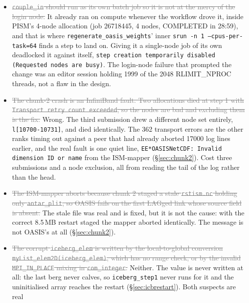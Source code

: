\documentclass[11pt,a4paper]{article}
\newcommand{\code}[1]{\texttt{\small #1}}
\newcommand{\dead}[1]{\textcolor{gray}{\sout{#1}}}
\begin{document}
\begin{itemize}
{      ISM-mapper starts.} Held for one leg and then failed. It recurred on 2026-08-10 with the
      mapper alive and nothing else dead, and did not recur on the rerun of the same leg
      (\S\ref{sec:lz0h}). Two clean legs were read as a cure for something intermittent.
\item \dead{\code{couple\_in} should run as its own batch job so it is not at the mercy of the
      login node.} It already ran on compute whenever the workflow drove it, inside PISM's 4-node
      allocation (job 26718445, 4 nodes, COMPLETED in 28:59), and that is where
      \code{regenerate\_oasis\_weights}' inner \code{srun -n 1 --cpus-per-task=64} finds a step to
      land on. Giving it a single-node job of its own deadlocked it against itself,
      \code{step creation temporarily disabled (Requested nodes are busy)}. The login-node failure
      that prompted the change was an editor session holding 1999 of the 2048 RLIMIT\_NPROC
      threads, not a flaw in the design.
\item \dead{The chunk-2 crash is an InfiniBand fault. Two allocations died at step 1 with
      \code{Transport retry count exceeded}, so the nodes are bad and excluding them is the fix.}
      Wrong. The third submission drew a different node set entirely,
      \code{l[10700-10731]}, and died identically. The 362 transport errors are the other ranks
      timing out against a peer that had already aborted 17000 log lines earlier, and the real
      fault is one quiet line, \code{*EE*OASISNetCDF: Invalid dimension ID or name} from the
      ISM-mapper (\S\ref{sec:chunk2}). Cost three submissions and a node exclusion, all from
      reading the tail of the log rather than the head.
\item \dead{The ISM-mapper aborts because chunk 2 staged a stale \code{rstism.nc} holding only
      \code{antar\_plit}, so OASIS fails on the first LAGged link whose source field is absent.}
      The stale file was real and is fixed, but it is not the cause: with the correct 8.5\,MB
      restart staged the mapper aborted identically. The message is not OASIS's at all
      (\S\ref{sec:chunk2}).
\item \dead{The corrupt \code{iceberg\_elem} is written by the local-to-global conversion
      \code{myList\_elem2D(iceberg\_elem)}, which has no range check, or by the invalid
      \code{MPI\_IN\_PLACE} mixing in \code{com\_integer}.} Neither. The value is never written at
      all: the last berg never calves, so \code{iceberg\_step1} never runs for it and the
      uninitialised array reaches the restart (\S\ref{sec:icbrestart}). Both suspects are real

\end{itemize}
\end{document}
